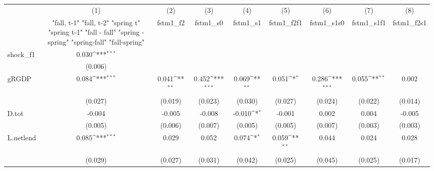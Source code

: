 {
\def\sym#1{\ifmmode^{#1}\else\(^{#1}\)\fi}
\begin{tabular}{l*{8}{c}}
\toprule
            &\multicolumn{1}{c}{(1)}&\multicolumn{1}{c}{(2)}&\multicolumn{1}{c}{(3)}&\multicolumn{1}{c}{(4)}&\multicolumn{1}{c}{(5)}&\multicolumn{1}{c}{(6)}&\multicolumn{1}{c}{(7)}&\multicolumn{1}{c}{(8)}\\
            &\multicolumn{1}{c}{  "fall, t-1" "fall, t-2" "spring t" "spring t-1"  "fall - fall" "spring - spring" "spring-fall" "fall-spring" }&\multicolumn{1}{c}{fstm1\_f2}&\multicolumn{1}{c}{fstm1\_s0}&\multicolumn{1}{c}{fstm1\_s1}&\multicolumn{1}{c}{fstm1\_f2f1}&\multicolumn{1}{c}{fstm1\_s1s0}&\multicolumn{1}{c}{fstm1\_s1f1}&\multicolumn{1}{c}{fstm1\_f2s1}\\
\midrule
shock\_f1    &       0.030\sym{***}&                     &                     &                     &                     &                     &                     &                     \\
            &     (0.006)         &                     &                     &                     &                     &                     &                     &                     \\
\addlinespace
gRGDP       &       0.084\sym{***}&       0.041\sym{**} &       0.452\sym{***}&       0.069\sym{**} &       0.051\sym{*}  &       0.286\sym{***}&       0.055\sym{**} &       0.002         \\
            &     (0.027)         &     (0.019)         &     (0.023)         &     (0.030)         &     (0.027)         &     (0.024)         &     (0.022)         &     (0.014)         \\
\addlinespace
D.tot       &      -0.004         &      -0.005         &      -0.008         &      -0.010\sym{*}  &      -0.001         &       0.002         &       0.004         &      -0.005         \\
            &     (0.005)         &     (0.006)         &     (0.007)         &     (0.005)         &     (0.005)         &     (0.007)         &     (0.003)         &     (0.003)         \\
\addlinespace
L.netlend   &       0.085\sym{***}&       0.029         &       0.052         &       0.074\sym{*}  &       0.059\sym{**} &       0.044         &       0.024         &       0.028         \\
            &     (0.029)         &     (0.027)         &     (0.031)         &     (0.042)         &     (0.025)         &     (0.045)         &     (0.025)         &     (0.017)         \\

\end{tabular}}
